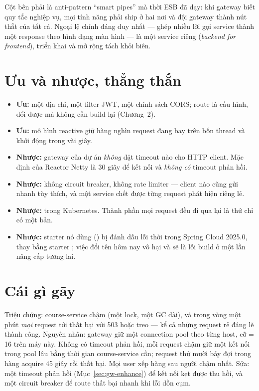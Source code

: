 Cột bên phải là anti-pattern ``smart pipes'' mà thời ESB đã dạy: khi
gateway biết quy tắc nghiệp vụ, mọi tính năng phải ship ở hai nơi và
đội gateway thành nút thắt của tất cả. Ngoại lệ chính đáng duy nhất
--- ghép nhiều lời gọi service thành một response theo hình dạng màn
hình --- là một service riêng (\emph{backend for frontend}), triển
khai và mở rộng tách khỏi biên.

\section{Ưu và nhược, thẳng thắn}

\begin{itemize}
  \item \textbf{Ưu:} một địa chỉ, một filter JWT, một chính sách CORS;
  route là cấu hình, đổi được mà không cần build lại (Chương~2).
  \item \textbf{Ưu:} mô hình reactive giữ hàng nghìn request đang bay
  trên bốn thread và khởi động trong vài giây.
  \item \textbf{Nhược:} gateway của dự án \emph{không} đặt timeout nào
  cho HTTP client. Mặc định của Reactor Netty là 30 giây để kết nối và
  \emph{không có} timeout phản hồi.
  \item \textbf{Nhược:} không circuit breaker, không rate limiter ---
  client nào cũng gửi nhanh tùy thích, và một service chết được từng
  request phát hiện riêng lẻ.
  \item \textbf{Nhược:}  trong Kubernetes. Thành phần
  mọi request đều đi qua lại là thứ chỉ có một bản.
  \item \textbf{Nhược:} starter nó dùng
  () bị đánh dấu lỗi thời trong
  Spring Cloud 2025.0, thay bằng starter
  ; việc đổi tên hôm nay vô hại và sẽ là
  lỗi build ở một lần nâng cấp tương lai.
\end{itemize}

\section{Cái gì gãy}

\begin{pitfall}
Triệu chứng: course-service chậm (một lock, một GC dài), và trong vòng
một phút \emph{mọi} request tới  thất bại với 503
hoặc treo --- kể cả những request rẻ đáng lẽ thành công. Nguyên nhân:
gateway giữ một connection pool theo từng host, cỡ
 = 16 trên máy này. Không có timeout
phản hồi, mỗi request chậm giữ một kết nối trong pool lâu bằng thời
gian course-service cần; request thứ mười bảy đợi trong hàng
acquire 45 giây rồi thất bại. Mọi user xếp hàng sau người chậm nhất.
Sửa: một timeout phản hồi (Mục~\ref{sec:gw-enhance}) để kết nối kẹt
được thu hồi, và một circuit breaker để route thất bại nhanh khi lỗi
dồn cụm.
\end{pitfall}

